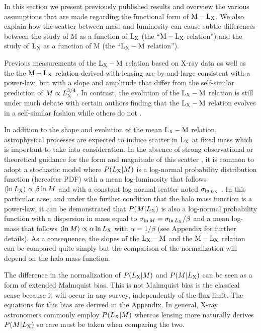 \documentclass[12pt]{emulateapj}
\newcommand{\mlx}{$\rm{M} - \rm{L}_{\rm X}$ }
\newcommand{\lxm}{$\rm{L}_{\rm X} - \rm{M}$ }
\newcommand{\lx}{$\rm{L}_{\rm X}$ }
\begin{document}
In this section we present previously published results and overview
the various assumptions that are made regarding the functional form of
$\rm{M} - \rm{L}_{\rm X}$. We also explain how the scatter between
mass and luminosity can cause subtle differences between the study of
M as a function of \lx (the ``\mlx relation'') and the study of \lx as
a function of M (the ``\lxm relation'').

Previous measurements of the \lxm relation based on X-ray data
\citep[][]{Reiprich:2002,Allen:2003,Popesso:2005,Chen:2007,Pratt:2008,Zhang:2008,Vikhlinin:2009}
as well as the the \mlx relation derived with lensing
\citep[][]{Hoekstra:2007a,Bardeau:2007,Rykoff:2008} are by-and-large
consistent with a power-law, but with a slope and amplitude that
differ from the self-similar prediction of $M \propto L_{\rm
  X}^{3/4}$. In contrast, the evolution of the \lxm relation is still
under much debate with certain authors finding that the \lxm relation
evolves in a self-similar fashion
\citep[][]{Lumb:2004,Arnaud:2005,Kotov:2005,Maughan:2007} while others
do not \citep[][]{Ettori:2004}.

In addition to the shape and evolution of the mean \lxm relation,
astrophysical processes are expected to induce scatter in \lx at fixed
mass which is important to take into consideration. In the absence of
strong observational or theoretical guidance for the form and
magnitude of this scatter \citep[although
see][]{Reiprich:2002,Maughan:2007}, it is common to adopt a stochastic
model where $P(L_{\rm X}|M)$ is a log-normal probability distribution
function (hereafter PDF) with a mean log-luminosity that follows
$\langle \ln L_{\rm X} \rangle \propto \beta \ln M$ and with a
constant log-normal scatter noted $\sigma_{\ln L_{\rm X}}$
\citep[][]{Stanek:2006, Rozo:2008, Rykoff:2008, Vikhlinin:2009}. In
this particular case, and under the further condition that the halo
mass function is a power-law, it can be demonstrated that $P(M|L_{\rm
  X})$ is also a log-normal probability function with a dispersion in
mass equal to $\sigma_{\ln M}=\sigma_{\ln L_{\rm X}}/\beta$ and a mean
log-mass that follows $\langle \ln M \rangle \propto \alpha \ln L_{\rm
  X}$ with $\alpha=1/\beta$ (see Appendix for further details). As a
consequence, the slopes of the \lxm and the \mlx relation can be
compared quite simply but the comparison of the normalization will
depend on the halo mass function.

The difference in the normalization of $P(L_{\rm X}|M)$ and
$P(M|L_{\rm X})$ can be seen as a form of extended Malmquist
bias. This is not Malmquist bias is the classical sense because it
will occur in any survey, independently of the flux limit. The
equations for this bias are derived in the Appendix. In general, X-ray
astronomers commonly employ $P(L_{\rm X}|M)$ \citep[][]{Stanek:2006,
  Vikhlinin:2009} whereas lensing more naturally derives $P(M|L_{\rm
  X})$\citep[][]{Rozo:2008, Rykoff:2008} so care must be taken when
comparing the two.
\end{document}
